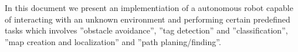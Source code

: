 In this document we present an implementiation of a autonomous robot capable of interacting with an unknown environment and performing certain predefined tasks which involves ''obstacle avoidance'', ''tag detection'' and ''classification'', ''map creation and localization'' and ''path planing/finding''.
